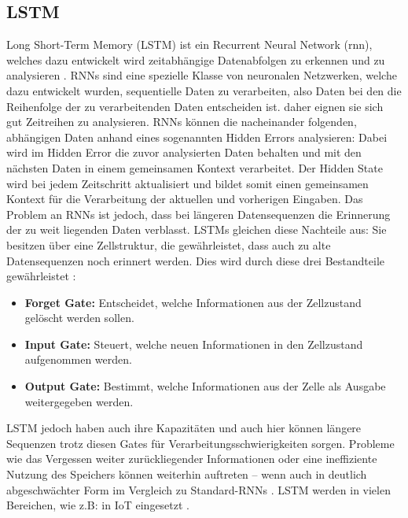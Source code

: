 \documentclass[a4paper,12pt]{article}
\begin{document}
	\subsection{LSTM}
	Long Short-Term Memory (LSTM) ist ein Recurrent Neural Network (\gls{rnn}), welches dazu entwickelt wird zeitabhängige Datenabfolgen zu erkennen und zu analysieren \cite{staudemeyer2019understanding}.
	RNNs sind eine spezielle Klasse von neuronalen Netzwerken, welche dazu entwickelt wurden, sequentielle Daten zu verarbeiten, also Daten bei den die Reihenfolge der zu verarbeitenden Daten entscheiden ist. daher eignen sie sich gut Zeitreihen zu analysieren. RNNs können die nacheinander folgenden, abhängigen Daten anhand eines sogenannten Hidden Errors analysieren: Dabei wird im Hidden Error die zuvor analysierten Daten behalten und mit den nächsten Daten in einem gemeinsamen Kontext verarbeitet. Der Hidden State wird bei jedem Zeitschritt aktualisiert und bildet somit einen gemeinsamen Kontext für die Verarbeitung der aktuellen und vorherigen Eingaben.
	Das Problem an RNNs ist jedoch, dass bei längeren Datensequenzen die Erinnerung der zu weit liegenden Daten verblasst.
	LSTMs gleichen diese Nachteile aus: Sie besitzen über eine Zellstruktur, die gewährleistet, dass auch zu alte Datensequenzen noch erinnert werden.
	Dies wird durch diese drei Bestandteile gewährleistet \cite{hochreiter1997long}:
	\begin{itemize}
		\item \textbf{Forget Gate:} Entscheidet, welche Informationen aus der Zellzustand gelöscht werden sollen.
		\item \textbf{Input Gate:}  Steuert, welche neuen Informationen in den Zellzustand aufgenommen werden.
		\item \textbf{Output Gate:} Bestimmt, welche Informationen aus der Zelle als Ausgabe weitergegeben werden.
	\end{itemize}
	LSTM jedoch haben auch ihre Kapazitäten und auch hier können längere Sequenzen trotz diesen Gates für Verarbeitungsschwierigkeiten sorgen.
	Probleme wie das Vergessen weiter zurückliegender Informationen oder eine ineffiziente Nutzung des Speichers können weiterhin auftreten – wenn auch in deutlich abgeschwächter Form im Vergleich zu Standard-RNNs \cite{hochreiter1997long}.
	LSTM werden in vielen Bereichen, wie z.B: in IoT eingesetzt \cite{wei2022lstm}.
	
\end{document}
